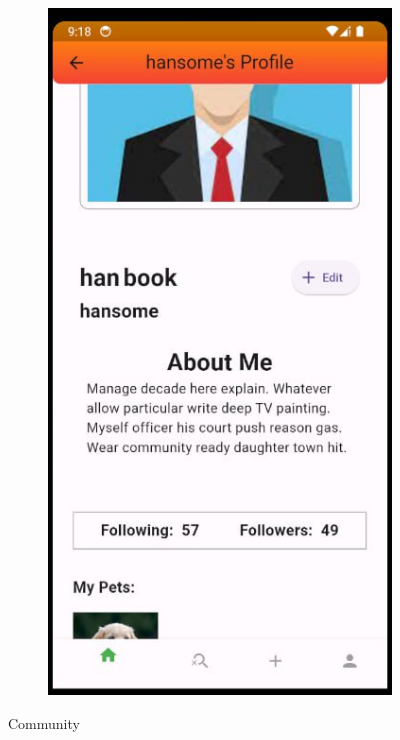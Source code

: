 \begin{figure}[ht]
\begin{subfigure}{0.3\textwidth}
    \includegraphics[width=\linewidth]{img/profile.jpg}
  \end{subfigure}%
 \caption{Community}
  \label{fig:UI}
\end{figure}